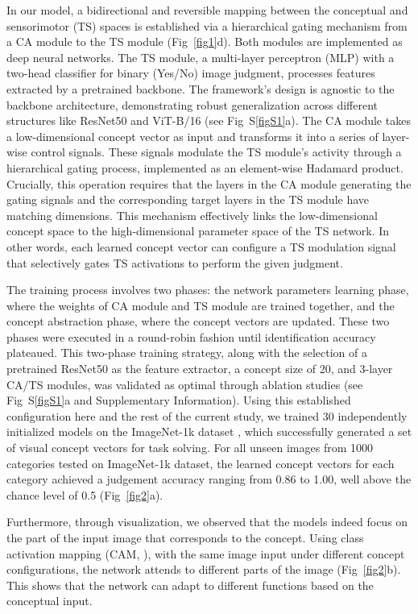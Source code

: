 \documentclass[pdflatex,sn-mathphys-num,lineno]{sn-jnl}%
\begin{document}
\begin{CJK}{UTF8}{gbsn}
In our model, a bidirectional and reversible mapping between the conceptual and sensorimotor (TS) spaces is established via a hierarchical gating mechanism from a CA module to the TS module (Fig~\ref{fig1}d). Both modules are implemented as deep neural networks. The TS module, a multi-layer perceptron (MLP) with a two-head classifier for binary (Yes/No) image judgment, processes features extracted by a pretrained backbone. The framework's design is agnostic to the backbone architecture, demonstrating robust generalization across different structures like ResNet50 \cite{he_deep_2016} and ViT-B/16 \cite{dosovitskiy_image_2021} (see Fig~S\ref{figS1}a). The CA module takes a low-dimensional concept vector as input and transforms it into a series of layer-wise control signals. These signals modulate the TS module's activity through a hierarchical gating process, implemented as an element-wise Hadamard product. Crucially, this operation requires that the layers in the CA module generating the gating signals and the corresponding target layers in the TS module have matching dimensions. This mechanism effectively links the low-dimensional concept space to the high-dimensional parameter space of the TS network. In other words, each learned concept vector can configure a TS modulation signal that selectively gates TS activations to perform the given judgment.

The training process involves two phases: the network parameters learning phase, where the weights of CA module and TS module are trained together, and the concept abstraction phase, where the concept vectors are updated. These two phases were executed in a round-robin fashion until identification accuracy plateaued. This two-phase training strategy, along with the selection of a pretrained ResNet50 as the feature extractor, a concept size of 20, and 3-layer CA/TS modules, was validated as optimal through ablation studies (see Fig~S\ref{figS1}a and Supplementary Information). Using this established configuration here and the rest of the current study, we trained 30 independently initialized models on the ImageNet-1k dataset \cite{deng_imagenet_2009}, which successfully generated a set of visual concept vectors for task solving. For all unseen images from 1000 categories tested on ImageNet-1k dataset, the learned concept vectors for each category achieved a judgement accuracy ranging from 0.86 to 1.00, well above the chance level of 0.5 (Fig~\ref{fig2}a).

Furthermore, through visualization, we observed that the models indeed focus on the part of the input image that corresponds to the concept. Using class activation mapping (CAM, \cite{selvaraju_grad-cam_2017}), with the same image input under different concept configurations, the network attends to different parts of the image (Fig~\ref{fig2}b). This shows that the network can adapt to different functions based on the conceptual input.


\end{CJK}
\end{document}
